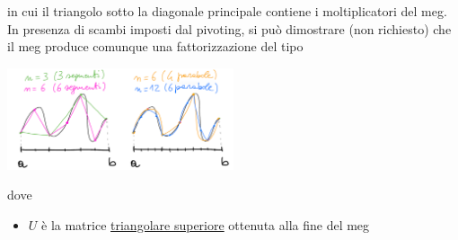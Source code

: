 in cui il triangolo sotto la diagonale principale contiene i moltiplicatori del meg.\\
In presenza di scambi imposti dal pivoting, si può dimostrare (non richiesto) che il meg produce comunque una fattorizzazione del tipo
\begin{center}
    \includegraphics[width = 0.5\textwidth]{foto/pag17}
\end{center}
dove
\begin{itemize}
    \item $U$ è la matrice \uline{triangolare superiore} ottenuta alla fine del meg
    

\end{itemize}
